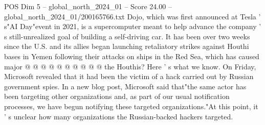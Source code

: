 \begin{textsample}{POS Dim 5 – global\_north\_2024\_01 – Score 24.00 – global\_north\_2024\_01/200165766.txt}
Dojo, which was first announced at Tesla ' s"AI Day"event in 2021, is a supercomputer meant to help advance the company ' s still-unrealized goal of building a self-driving car.
It has been over two weeks since the U.S. and its allies began launching retaliatory strikes against Houthi bases in Yemen following their attacks on ships in the Red Sea, which has caused major @ @ @ @ @ @ @ @ @ @ the Houthis?
Here ' s what we know.
On Friday, Microsoft revealed that it had been the victim of a hack carried out by Russian government spies.
In a new blog post, Microsoft said that"the same actor has been targeting other organizations and, as part of our usual notification processes, we have begun notifying these targeted organizations."At this point, it ' s unclear how many organizations the Russian-backed hackers targeted.

\end{textsample}
